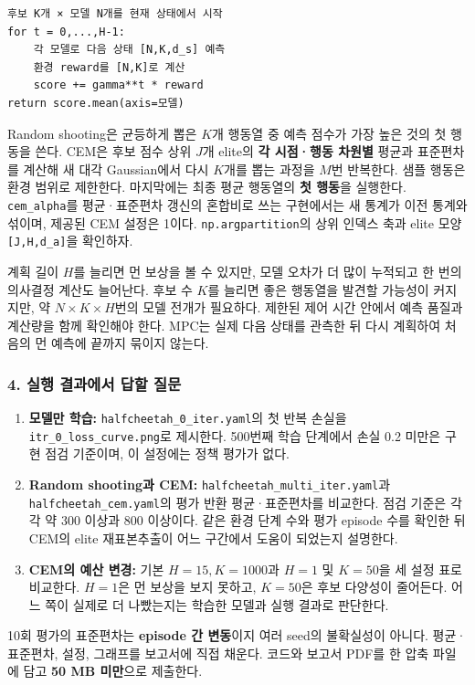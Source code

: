 \documentclass[11pt,a4paper]{article}
\begin{document}
\begin{verbatim}
후보 K개 × 모델 N개를 현재 상태에서 시작
for t = 0,...,H-1:
    각 모델로 다음 상태 [N,K,d_s] 예측
    환경 reward를 [N,K]로 계산
    score += gamma**t * reward
return score.mean(axis=모델)
\end{verbatim}

Random shooting은 균등하게 뽑은 $K$개 행동열 중 예측 점수가 가장 높은 것의 첫 행동을 쓴다. CEM은 후보 점수 상위 $J$개 elite의 \textbf{각 시점·행동 차원별} 평균과 표준편차를 계산해 새 대각 Gaussian에서 다시 $K$개를 뽑는 과정을 $M$번 반복한다. 샘플 행동은 환경 범위로 제한한다. 마지막에는 최종 평균 행동열의 \textbf{첫 행동}을 실행한다. \texttt{cem\_\allowbreak{}alpha}를 평균·표준편차 갱신의 혼합비로 쓰는 구현에서는 새 통계가 이전 통계와 섞이며, 제공된 CEM 설정은 1이다. \texttt{np.\allowbreak{}argpartition}의 상위 인덱스 축과 elite 모양 \texttt{[J,\allowbreak{}H,\allowbreak{}d\_\allowbreak{}a]}을 확인하자.\par

계획 길이 $H$를 늘리면 먼 보상을 볼 수 있지만, 모델 오차가 더 많이 누적되고 한 번의 의사결정 계산도 늘어난다. 후보 수 $K$를 늘리면 좋은 행동열을 발견할 가능성이 커지지만, 약 $N\times K\times H$번의 모델 전개가 필요하다. 제한된 제어 시간 안에서 예측 품질과 계산량을 함께 확인해야 한다. MPC는 실제 다음 상태를 관측한 뒤 다시 계획하여 처음의 먼 예측에 끝까지 묶이지 않는다.\par

\subsubsection{4. 실행 결과에서 답할 질문}

\begin{enumerate}
\item \textbf{모델만 학습:} \texttt{halfcheetah\_\allowbreak{}0\_\allowbreak{}iter.\allowbreak{}yaml}의 첫 반복 손실을 \texttt{itr\_\allowbreak{}0\_\allowbreak{}loss\_\allowbreak{}curve.\allowbreak{}png}로 제시한다. 500번째 학습 단계에서 손실 0.2 미만은 구현 점검 기준이며, 이 설정에는 정책 평가가 없다.
\item \textbf{Random shooting과 CEM:} \texttt{halfcheetah\_\allowbreak{}multi\_\allowbreak{}iter.\allowbreak{}yaml}과 \texttt{halfcheetah\_\allowbreak{}cem.\allowbreak{}yaml}의 평가 반환 평균·표준편차를 비교한다. 점검 기준은 각각 약 300 이상과 800 이상이다. 같은 환경 단계 수와 평가 episode 수를 확인한 뒤 CEM의 elite 재표본추출이 어느 구간에서 도움이 되었는지 설명한다.
\item \textbf{CEM의 예산 변경:} 기본 $H=15,K=1000$과 $H=1$ 및 $K=50$을 세 설정 표로 비교한다. $H=1$은 먼 보상을 보지 못하고, $K=50$은 후보 다양성이 줄어든다. 어느 쪽이 실제로 더 나빴는지는 학습한 모델과 실행 결과로 판단한다.
\end{enumerate}

10회 평가의 표준편차는 \textbf{episode 간 변동}이지 여러 seed의 불확실성이 아니다. 평균·표준편차, 설정, 그래프를 보고서에 직접 채운다. 코드와 보고서 PDF를 한 압축 파일에 담고 \textbf{50 MB 미만}으로 제출한다.\par
\end{document}
